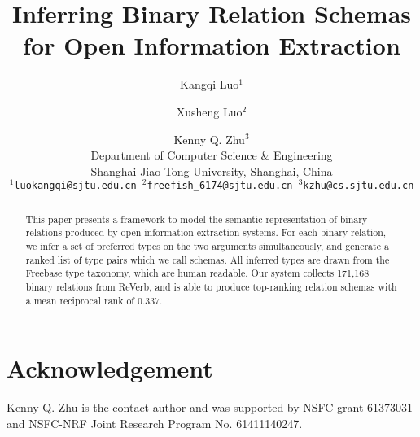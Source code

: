 \documentclass[11pt]{article}
\title{Inferring Binary Relation Schemas for Open Information Extraction}
\author{Kangqi Luo$^1$ \and Xusheng Luo$^2$ \and Kenny Q. Zhu$^3$\\
  Department of Computer Science \& Engineering \\
  Shanghai Jiao Tong University, Shanghai, China \\
  {\small \tt $^1$luokangqi@sjtu.edu.cn $^2$freefish\_6174@sjtu.edu.cn $^3$kzhu@cs.sjtu.edu.cn} \\}
\date{}
\begin{document}
\maketitle
\begin{abstract}

This paper presents a framework to model the semantic representation
of binary relations produced by open information extraction systems.
For each binary relation, we infer a set of preferred types on the two
arguments simultaneously,
and generate a ranked list of type pairs which we call schemas.
All inferred types are drawn from the Freebase type taxonomy,
which are human readable. Our system collects 171,168 binary
relations from ReVerb, and is able to produce
top-ranking relation schemas with a mean reciprocal rank of 0.337.


\end{abstract}









%



\section*{Acknowledgement}
Kenny Q. Zhu is the contact author and was supported by
NSFC grant 61373031 and NSFC-NRF Joint Research Program No. 61411140247.



\end{document}
